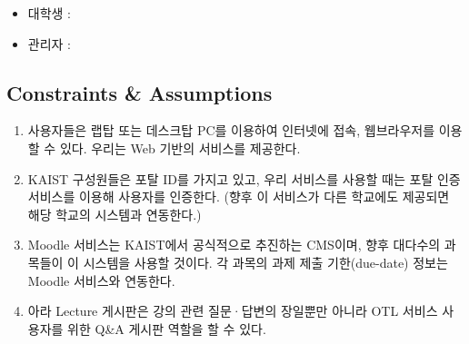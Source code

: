 \documentclass[a4paper,titlepage]{article}
\begin{document}
\begin{itemize}

	\item 대학생 :

	\item 관리자 :

\end{itemize}

\subsection{Constraints \& Assumptions}

\begin{enumerate}
	\item 사용자들은 랩탑 또는 데스크탑 PC를 이용하여 인터넷에 접속, 웹브라우저를 이용할 수 있다.
	우리는 Web 기반의 서비스를 제공한다.

	\item KAIST 구성원들은 포탈 ID를 가지고 있고, 우리 서비스를 사용할 때는 포탈 인증 서비스를 이용해 사용자를 인증한다.
	(향후 이 서비스가 다른 학교에도 제공되면 해당 학교의 시스템과 연동한다.)

	\item Moodle 서비스는 KAIST에서 공식적으로 추진하는 CMS이며, 향후 대다수의 과목들이 이 시스템을 사용할 것이다.
	각 과목의 과제 제출 기한(due-date) 정보는 Moodle 서비스와 연동한다.

	\item 아라 Lecture 게시판은 강의 관련 질문·답변의 장일뿐만 아니라 OTL 서비스 사용자를 위한 Q\&A 게시판 역할을 할 수 있다.

\end{enumerate}
\end{document}
